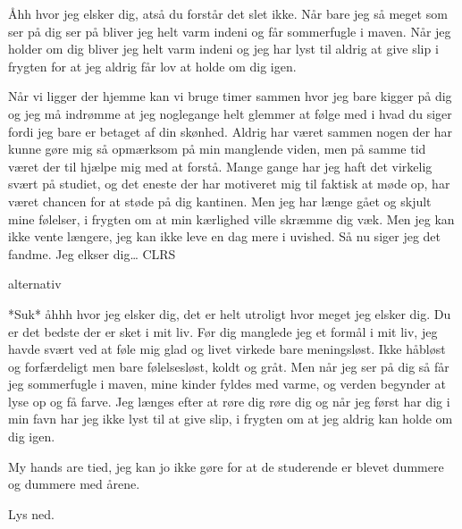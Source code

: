 \documentclass{article}
\begin{document}
\begin{sketch}
Åhh hvor jeg elsker dig, atså du forstår det slet ikke. Når bare jeg så meget som ser på dig ser på bliver jeg helt varm indeni og får sommerfugle i maven. Når jeg holder om dig bliver jeg helt varm indeni og jeg har lyst til aldrig at give slip i frygten for at jeg aldrig får lov at holde om dig igen. 

Når vi ligger der hjemme kan vi bruge timer sammen hvor jeg bare kigger på dig og jeg må indrømme at jeg noglegange helt glemmer at følge med i hvad du siger fordi jeg bare er betaget af din skønhed. Aldrig har været sammen nogen der har kunne gøre mig så opmærksom på min manglende viden, men på samme tid været der til hjælpe mig med at forstå. 
Mange gange har jeg haft det virkelig svært på studiet, og det eneste der har motiveret mig til faktisk at møde op, har været chancen for at støde på dig kantinen.
Men jeg har længe gået og skjult mine følelser, i frygten om at min kærlighed ville skræmme dig væk. Men jeg kan ikke vente længere, jeg kan ikke leve en dag mere i uvished. Så nu siger jeg det fandme. Jeg elkser dig… CLRS



\scene alternativ


*Suk* åhhh hvor jeg elsker dig, det er helt utroligt hvor meget jeg elsker dig. Du er det bedste der er sket i mit liv. Før dig manglede jeg et formål i mit liv, jeg havde svært ved at føle mig glad og livet virkede bare meningsløst. 
Ikke håbløst og forfærdeligt men bare følelsesløst, koldt og gråt. Men når jeg ser på dig så får jeg sommerfugle i maven, mine kinder fyldes med varme, og verden begynder at lyse op og få farve.
Jeg længes efter at røre dig røre dig og når jeg først har dig i min favn har jeg ikke lyst til at give slip, i frygten om at jeg aldrig kan holde om dig igen. 




My hands are tied, jeg kan jo ikke gøre for at de studerende er blevet dummere og dummere med årene. 

\scene Lys ned.







\end{sketch}
\end{document}

